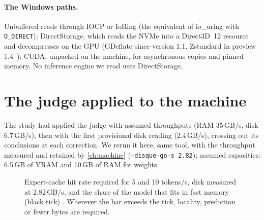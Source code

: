 \paragraph{The Windows paths.} Unbuffered reads through IOCP or IoRing (the equivalent of io\_uring with \texttt{O\_DIRECT}); DirectStorage, which reads the NVMe into a Direct3D~12 resource and decompresses on the GPU (GDeflate since version 1.1, Zstandard in preview 1.4~\cite{microsoft2026directstorage14}); CUDA, unpacked on the machine, for asynchronous copies and pinned memory. No inference engine we read uses DirectStorage.

\section{The judge applied to the machine}\label{sec:juge}

The study had applied the judge with assumed throughputs (RAM 35\,GB/s, disk 6.7\,GB/s), then with the first provisional disk reading (2.4\,GB/s), crossing out its conclusions at each correction. We rerun it here, same tool, with the throughput measured and retained by \cref{ch:machine} (\texttt{--disque-go-s 2.82}); assumed capacities: 6.5\,GB of VRAM and 10\,GB of RAM for weights.

\begin{figure}[ht]
\centering
\GrapheJuge
\caption[Required cache hit rate, model by model]{Expert-cache hit rate required for 5 and 10 tokens/s, disk measured at 2.82\,GB/s, and the share of the model that fits in fast memory (black tick) \calc. Wherever the bar exceeds the tick, locality, prediction or fewer bytes are required.}
\label{fig:juge}
\end{figure}

\begin{table}[ht]
\centering\small
\caption[The judge on the machine, disk at 2.4 then 2.82\,GB/s]{The judge on the machine: bound without locality and required hit rate, disk at 2.4\,GB/s (study 04) then 2.82\,GB/s (retained measurement) \calc.}
\label{tab:juge}
\end{table}

